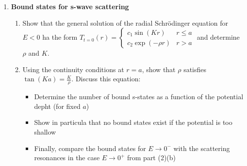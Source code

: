 \documentclass[11pt,a4paper]{scrartcl}
\begin{document}
\begin{enumerate}
        \item 
            \textbf{Bound states for s-wave scattering}
            \begin{enumerate}
                \item 
                    Show  that the general solution of the radial Schrödinger equation for $E < 0$ ha the form $T_{t=0}(r) = \begin{cases}
                        c_1 \sin(Kr) & r \leq a\\ c_2 \exp(-\rho r) & r > a
                    \end{cases}$
                    and determine $\rho$ and $K$.
                \item 
                    Using the continuity conditions at $r = a$, show that $\rho$ satisfies $\tan(K a) = \frac{K}{\rho}$.
                    Discuss this equation:
                    \begin{itemize}
                        \item 
                            Determine the number of bound s-states as a function of the potential depht (for fixed $a$)
                        \item 
                            Show in particula that no bound states exist if the potential is too shallow
                        \item
                            Finally, compare the bound states for $E \to 0^-$ with the scattering resonances in the case $E \to 0^+$ from part (2)(b)
                    \end{itemize}
            \end{enumerate}
    \end{enumerate}
\end{document}
